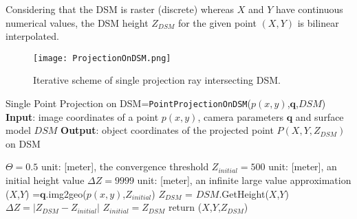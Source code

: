 Considering that the DSM is raster (discrete) whereas $X$ and $Y$ have continuous numerical values, the DSM height $Z_{DSM}$ for the given point $(X,Y)$ is bilinear interpolated.

\begin{figure}%
	\centering
	\texttt{[image: ProjectionOnDSM.png]}
	\caption{\small Iterative scheme of single projection ray intersecting DSM.}
	\label{fig:ProjectiononDSM}
\end{figure}

\begin{Algorithmus}
\caption{Single Point Projection on DSM\newline
	[$X$,$Y$,$Z_{DSM}$]=\texttt{PointProjectionOnDSM}($p(x,y)$,$\mathbf{q}$,$DSM$)\newline
	\textbf{Input}: image coordinates of a point $p(x,y)$, 
					camera parameters $\mathbf{q}$ and
					surface model $DSM$\newline
	\textbf{Output}: object coordinates of the projected point $P(X,Y,Z_{DSM})$ on DSM
}
\label{alg:LineProjectionOnDSM}
\begin{algorithmic}
\State $\Theta=0.5$
\Comment unit: [meter], the convergence threshold
\State $Z_{initial}=500$
\Comment unit: [meter], an initial height value
\State $\Delta Z=9999$
\Comment unit: [meter], an infinite large value approximation
	\State ($X$,$Y$) =$\mathbf{q}$.img2geo($p(x,y)$,$Z_{initial}$)
	\State $Z_{DSM}$ = $DSM$.GetHeight($X$,$Y$)
	\State $\Delta Z=|Z_{DSM}-Z_{initial}|$
	\State $Z_{initial}=Z_{DSM}$
\EndWhile
\State return ($X$,$Y$,$Z_{DSM}$)

\end{algorithmic}
\end{Algorithmus}

